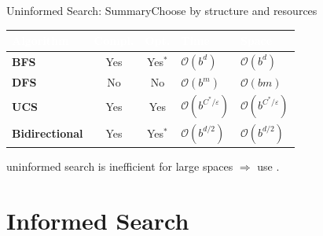 \documentclass[aspectratio=169,11pt]{beamer}
\begin{document}
\begin{frame}{Uninformed Search: Summary}{Choose by structure and resources}
  \small
  \renewcommand{\arraystretch}{1.3}
  \begin{center}
  \begin{tabularx}{\textwidth}{@{}>{\bfseries}l cc >{\raggedright\arraybackslash}X >{\raggedright\arraybackslash}X@{}}
    \toprule
    \rowcolor{PrimaryDark}
    \textcolor{white}{Algorithm} & \textcolor{white}{Compl.} & \textcolor{white}{Opt.} &
    \textcolor{white}{Time} & \textcolor{white}{Space} \\
    \midrule
    BFS & Yes & Yes$^\ast$ & $\mathcal{O}(b^{d})$ & $\mathcal{O}(b^{d})$ \\
    \rowcolor{PrimaryLight!25}
    DFS & No & No & $\mathcal{O}(b^{m})$ & $\mathcal{O}(bm)$ \\
    UCS & Yes & Yes & $\mathcal{O}(b^{C^{\ast}/\varepsilon})$ & $\mathcal{O}(b^{C^{\ast}/\varepsilon})$ \\
    \rowcolor{PrimaryLight!25}
    Bidirectional & Yes & Yes$^\ast$ & $\mathcal{O}(b^{d/2})$ & $\mathcal{O}(b^{d/2})$ \\
    \bottomrule
  \end{tabularx}
  \end{center}
  \begin{center}\small
     uninformed search is inefficient for large spaces
    $\Rightarrow$ use .
  \end{center}
\end{frame}

\section{Informed Search}
\end{document}
